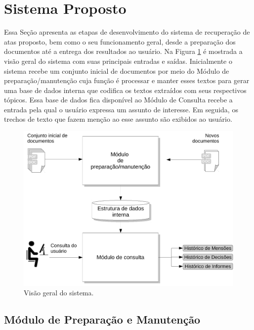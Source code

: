 \section{Sistema Proposto}
\label{sec:sistema-proposto}

Essa Seção apresenta as etapas de desenvolvimento do sistema de recuperação de atas proposto, bem como o seu funcionamento geral, desde a preparação dos documentos até a entrega dos resultados ao usuário. 
Na Figura \ref{fig:visao-geral} é mostrada a visão geral do sistema com suas principais entradas e saídas. Inicialmente o sistema recebe um conjunto inicial de documentos por meio do Módulo de preparação/manutenção cuja função é processar e manter esses textos para gerar uma base de dados interna que codifica os textos extraídos com seus respectivos tópicos. Essa base de dados fica disponível ao Módulo de Consulta recebe a entrada pela qual o usuário expressa um assunto de interesse. Em seguida, os trechos de texto que fazem menção ao esse assunto são exibidos ao usuário.


  \begin{figure}[!h]
	  \centering
	  \includegraphics[trim={ 0 0 0 0 },clip,page=1,width=.8\textwidth]{conteudo/capitulos/figs/visao-geral-4.pdf}
	  \caption{Visão geral do sistema.}
	  \label{fig:visao-geral}
  \end{figure}








\subsection{Módulo de Preparação e Manutenção}\label{sec:modulo-preparacao}

